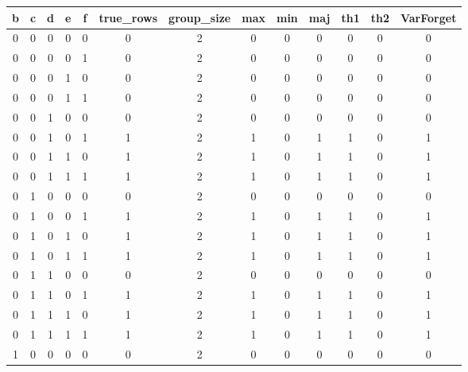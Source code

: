 \begin{table}[!tb]
    \centering
    \begin{tabular}{|c|c|c|c|c|c|c|c|c|c|c|c|c|}
        \hline
        \textbf{b} & \textbf{c} & \textbf{d} & \textbf{e} & \textbf{f} & \textbf{true\_rows} & \textbf{group\_size} & \textbf{max} & \textbf{min} & \textbf{maj} & \textbf{th1} & \textbf{th2} & \textbf{VarForget} \\ \hline
        \rowcolor{gray!40} 0 & 0 & 0 & 0 & 0 & 0 & 2 & 0 & 0 & 0 & 0 & 0 & 0 \\ \hline
        \rowcolor{blue!40} 0 & 0 & 0 & 0 & 1 & 0 & 2 & 0 & 0 & 0 & 0 & 0 & 0 \\ \hline
        \rowcolor{red!40} 0 & 0 & 0 & 1 & 0 & 0 & 2 & 0 & 0 & 0 & 0 & 0 & 0 \\ \hline
        \rowcolor{green!40} 0 & 0 & 0 & 1 & 1 & 0 & 2 & 0 & 0 & 0 & 0 & 0 & 0 \\ \hline
        \rowcolor{yellow!40} 0 & 0 & 1 & 0 & 0 & 0 & 2 & 0 & 0 & 0 & 0 & 0 & 0 \\ \hline
        \rowcolor{gray!40} 0 & 0 & 1 & 0 & 1 & 1 & 2 & 1 & 0 & 1 & 1 & 0 & 1 \\ \hline
        \rowcolor{blue!40} 0 & 0 & 1 & 1 & 0 & 1 & 2 & 1 & 0 & 1 & 1 & 0 & 1 \\ \hline
        \rowcolor{red!40} 0 & 0 & 1 & 1 & 1 & 1 & 2 & 1 & 0 & 1 & 1 & 0 & 1 \\ \hline
        \rowcolor{green!40} 0 & 1 & 0 & 0 & 0 & 0 & 2 & 0 & 0 & 0 & 0 & 0 & 0 \\ \hline
        \rowcolor{yellow!40} 0 & 1 & 0 & 0 & 1 & 1 & 2 & 1 & 0 & 1 & 1 & 0 & 1 \\ \hline
        \rowcolor{gray!40} 0 & 1 & 0 & 1 & 0 & 1 & 2 & 1 & 0 & 1 & 1 & 0 & 1 \\ \hline
        \rowcolor{blue!40} 0 & 1 & 0 & 1 & 1 & 1 & 2 & 1 & 0 & 1 & 1 & 0 & 1 \\ \hline
        \rowcolor{red!40} 0 & 1 & 1 & 0 & 0 & 0 & 2 & 0 & 0 & 0 & 0 & 0 & 0 \\ \hline
        \rowcolor{green!40} 0 & 1 & 1 & 0 & 1 & 1 & 2 & 1 & 0 & 1 & 1 & 0 & 1 \\ \hline
        \rowcolor{yellow!40} 0 & 1 & 1 & 1 & 0 & 1 & 2 & 1 & 0 & 1 & 1 & 0 & 1 \\ \hline
        \rowcolor{gray!40} 0 & 1 & 1 & 1 & 1 & 1 & 2 & 1 & 0 & 1 & 1 & 0 & 1 \\ \hline
        \rowcolor{blue!40} 1 & 0 & 0 & 0 & 0 & 0 & 2 & 0 & 0 & 0 & 0 & 0 & 0 \\ \hline

\end{tabular}
\end{table}
